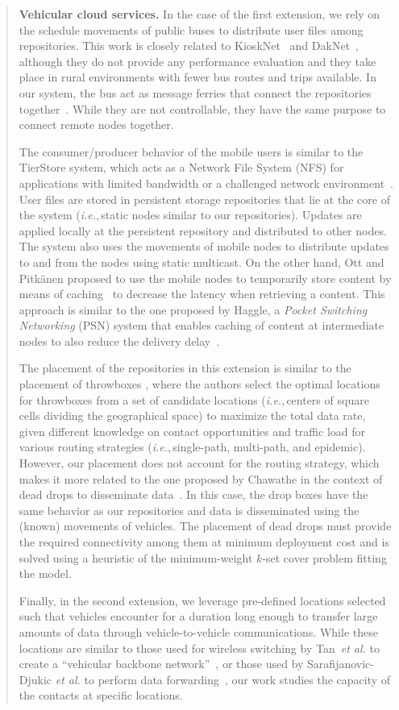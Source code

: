 \documentclass[11pt]{article}
\newcommand{\ie}{\textit{i.e.},\,}
\newcommand{\etal}{\textit{et al.}\xspace}
\begin{document}
\begin{quote}
\noindent\textbf{Vehicular cloud services.}
In the case of the first extension, we rely on the schedule movements of public buses to distribute user files among repositories. This work is closely related to KioskNet~\cite{seth2006low} and DakNet~\cite{pentland2004daknet}, although they do not provide any performance evaluation and they take place in rural environments with fewer bus routes and trips available. In our system, the bus act as message ferries that connect the repositories together~\cite{zhao2004message}. While they are not controllable, they have the same purpose to connect remote nodes together.

The consumer/producer behavior of the mobile users is similar to the TierStore system, which acts as a Network File System (NFS) for applications with limited bandwidth or a challenged network environment~\cite{demmer2008tierstore}. User files are stored in persistent storage repositories that lie at the core of the system (\ie static nodes similar to our repositories). Updates are applied locally at the persistent repository and distributed to other nodes. The system also uses the movements of mobile nodes to distribute updates to and from the nodes using static multicast. On the other hand, Ott and Pitk{\"a}nen proposed to use the mobile nodes to temporarily store content by means of caching~\cite{pitkanen2007redundancy,ott2007dtn} to decrease the latency when retrieving a content. This approach is similar to the one proposed by Haggle, a \textit{Pocket Switching Networking} (PSN) system that enables caching of content at intermediate nodes to also reduce the delivery delay~\cite{scott2006haggle}.

The placement of the repositories in this extension is similar to the placement of throwboxes \cite{zhao2006capacity}, where the authors select the optimal locations for throwboxes from a set of candidate locations (\ie centers of square cells dividing the geographical space) to maximize the total data rate, given different knowledge on contact opportunities and traffic load for various routing strategies (\ie single-path, multi-path, and epidemic). However, our placement does not account for the routing strategy, which makes it more related to the one proposed by Chawathe in the context of dead drops to disseminate data~\cite{chawathe2006inter}. In this case, the drop boxes have the same behavior as our repositories and data is disseminated using the (known) movements of vehicles. The placement of dead drops must provide the required connectivity among them at minimum deployment cost and is solved using a heuristic of the minimum-weight $k$-set cover problem fitting the model.

Finally, in the second extension, we leverage pre-defined locations selected such that vehicles encounter for a duration long enough to transfer large amounts of data through vehicle-to-vehicle communications. While these locations are similar to those used for wireless switching by Tan~\etal to create a ``vehicular backbone network''~\cite{tan2014vehicular}, or those used by Sarafijanovic-Djukic \etal to perform data forwarding~\cite{sarafijanovic2006island}, our work studies the capacity of the contacts at specific locations.
\end{quote}
\end{document}
